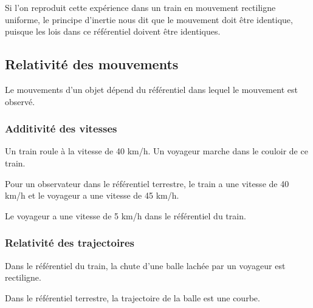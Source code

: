 Si l'on reproduit cette expérience dans un train en mouvement rectiligne uniforme, le principe d'inertie nous dit que le mouvement doit être identique, puisque les lois dans ce référentiel doivent être identiques.

\begin{center}

\end{center}

  \subsection{Relativité des mouvements}

Le mouvements d'un objet dépend du référentiel dans lequel le mouvement est observé.

    \subsubsection{Additivité des vitesses}

Un train roule à la vitesse de 40 km/h. Un voyageur marche dans le couloir de ce train.


\begin{center}

\end{center}


Pour un observateur dans le référentiel terrestre, le train a une vitesse de 40 km/h et le voyageur a une vitesse de 45 km/h. 

Le voyageur a une vitesse de 5 km/h dans le référentiel du train.

    \subsubsection{Relativité des trajectoires}

Dans le référentiel du train, la chute d'une balle lachée par un voyageur est rectiligne.

Dans le référentiel terrestre, la trajectoire de la balle est une courbe.





